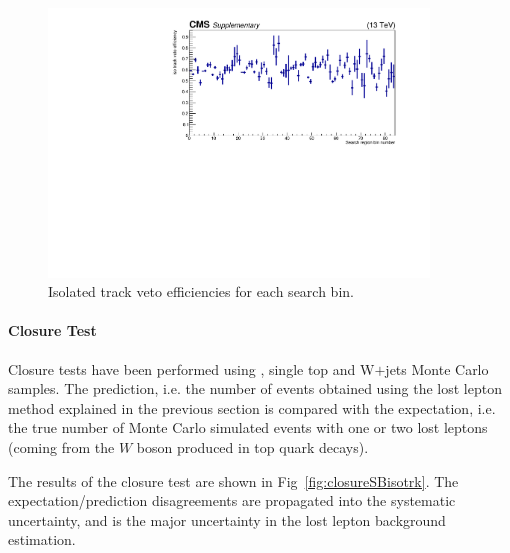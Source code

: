 \begin{figure}[htbp]
\begin{center}
\includegraphics[width=0.9\textwidth]{sections/mc4/Backgrounds/LostLepton/figures/v2_isotrackvetoEff.pdf}%
\end{center}
\caption{Isolated track veto efficiencies for each search bin.}
\label{fig:isotrackeff}
\end{figure}

\paragraph{Closure Test}
Closure tests have been performed using \ttbar, single top and W$+$jets Monte Carlo samples. The prediction, i.e. the number of events obtained using the lost lepton 
method explained in the previous section is compared with the expectation, i.e. the true number of Monte Carlo simulated events with one or two lost leptons (coming from the $W$ boson produced in top quark decays). 

The results of the closure test are shown in Fig~\ref{fig:closureSBisotrk}. The expectation/prediction disagreements are propagated into the systematic uncertainty, and is the major uncertainty in the lost lepton background estimation.

